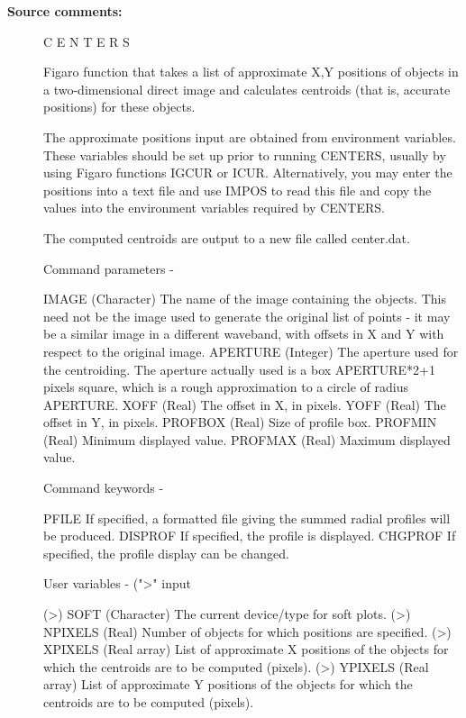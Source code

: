 \begin{description}
\item [\textbf{Source comments:}]
\begin{terminalv}
 C E N T E R S

 Figaro function that takes a list of approximate X,Y positions
 of objects in a two-dimensional direct image and calculates
 centroids (that is, accurate positions) for these objects.

 The approximate positions input are obtained from environment
 variables.  These variables should be set up prior to running
 CENTERS, usually by using Figaro functions IGCUR or ICUR.
 Alternatively, you may enter the positions into a text file and use
 IMPOS to read this file and copy the values into the environment
 variables required by CENTERS.

 The computed centroids are output to a new file called center.dat.

 Command parameters -

 IMAGE    (Character) The name of the image containing the
          objects.  This need not be the image used to
          generate the original list of points - it may be
          a similar image in a different waveband, with
          offsets in X and Y with respect to the original image.
 APERTURE (Integer) The aperture used for the centroiding.
          The aperture actually used is a box APERTURE*2+1
          pixels square, which is a rough approximation to a
          circle of radius APERTURE.
 XOFF     (Real) The offset in X, in pixels.
 YOFF     (Real) The offset in Y, in pixels.
 PROFBOX  (Real) Size of profile box.
 PROFMIN  (Real) Minimum displayed value.
 PROFMAX  (Real) Maximum displayed value.

 Command keywords -

 PFILE    If specified, a formatted file giving the summed
          radial profiles will be produced.
 DISPROF  If specified, the profile is displayed.
 CHGPROF  If specified, the profile display can be changed.

 User variables - (">" input

 (>) SOFT    (Character) The current device/type for soft plots.
 (>) NPIXELS (Real) Number of objects for which positions are
              specified.
 (>) XPIXELS (Real array) List of approximate X positions of the
             objects for which the centroids are to be computed
             (pixels).
 (>) YPIXELS (Real array) List of approximate Y positions of the
             objects for which the centroids are to be computed
             (pixels).


\end{terminalv}
\end{description}
